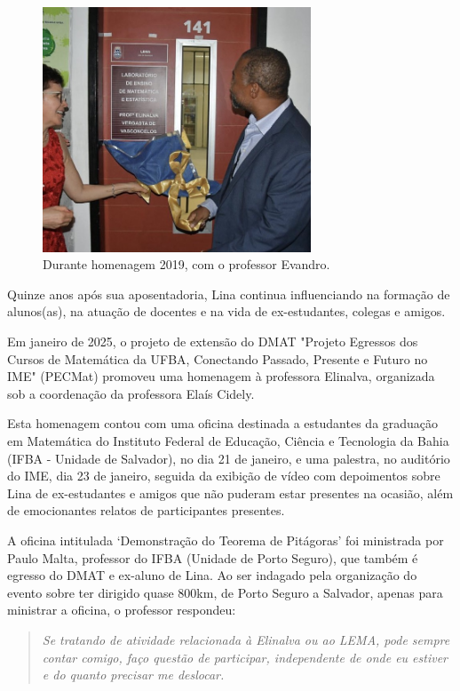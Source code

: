 \documentclass{hipatia}
\begin{document}
\begin{figure}[htb!]
\includegraphics[width=8cm]{Evandro.jpg}
\caption{Durante homenagem 2019, com o professor Evandro.}   
\end{figure}


Quinze anos após sua aposentadoria, Lina continua influenciando na formação de alunos(as), na atuação de docentes e na vida de ex-estudantes, colegas e amigos.

Em janeiro de 2025, o projeto de extensão do DMAT "Projeto Egressos dos Cursos de Matemática da UFBA, Conectando Passado, Presente e Futuro no IME" (PECMat) promoveu uma homenagem à professora Elinalva, organizada sob a coordenação da professora Elaís Cidely.

Esta homenagem contou com uma oficina destinada a estudantes da graduação em Matemática do Instituto Federal de Educação, Ciência e Tecnologia da Bahia (IFBA - Unidade de Salvador), no dia 21 de janeiro, e uma palestra, no auditório do IME, dia 23 de janeiro, seguida da exibição de vídeo com depoimentos sobre Lina de ex-estudantes e amigos que não puderam estar presentes na ocasião, além de emocionantes relatos de participantes presentes.

A oficina intitulada `Demonstração do Teorema de Pitágoras' foi ministrada por Paulo Malta, professor do IFBA (Unidade de Porto Seguro), que também é egresso do DMAT e ex-aluno de Lina. Ao ser indagado pela organização do evento sobre ter dirigido quase 800km, de Porto Seguro a Salvador, apenas para ministrar a oficina, o professor respondeu: \begin{quote}
    \textit{Se tratando de atividade relacionada à Elinalva ou ao LEMA, pode sempre contar comigo, faço questão de participar, independente de onde eu estiver e do quanto precisar me deslocar.}
\end{quote}
\end{document}
